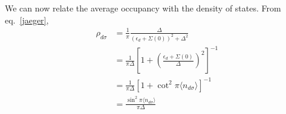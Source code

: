 \documentclass[twoside]{report}
\numberwithin{equation}{section}
\begin{document}
We can now relate the average occupancy with the density of states.
From eq.~\ref{jaeger},
\begin{equation}\begin{aligned}
	\rho_{d\sigma} &= \frac{1}{\pi}\frac{\Delta}{\left(\epsilon_d + \Sigma(0)\right)^2 + \Delta^2}\\
		       &= \frac{1}{\pi\Delta}\left[1+\left(\frac{\epsilon_d+\Sigma(0)}{\Delta}\right)^2\right]^{-1}\\
		       &=\frac{1}{\pi\Delta}\left[1+\cot^2\pi\langle  n_{d\sigma}\rangle\right]^{-1}\\
		       &=\frac{\sin^2 \pi\langle  n_{d\sigma}\rangle}{\pi \Delta}
\end{aligned}\end{equation}
\\
\end{document}
